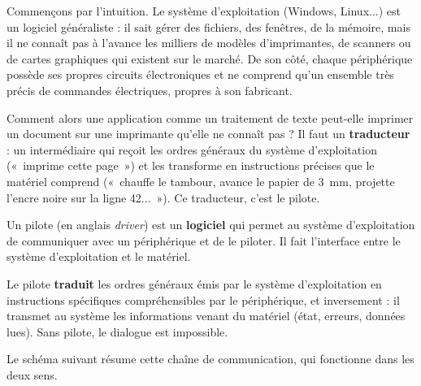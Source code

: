 \documentclass[11pt]{article}
\newcommand{\cle}[1]{{\popxbold\color{popdark}#1}}
\begin{document}
Commençons par l'intuition. Le système d'exploitation (Windows, Linux...) est un logiciel généraliste : il sait gérer des fichiers, des fenêtres, de la mémoire, mais il ne connaît pas à l'avance les milliers de modèles d'imprimantes, de scanners ou de cartes graphiques qui existent sur le marché. De son côté, chaque périphérique possède ses propres circuits électroniques et ne comprend qu'un ensemble très précis de commandes électriques, propres à son fabricant.

Comment alors une application comme un traitement de texte peut-elle imprimer un document sur une imprimante qu'elle ne connaît pas ? Il faut un \textbf{traducteur} : un intermédiaire qui reçoit les ordres généraux du système d'exploitation («~imprime cette page~») et les transforme en instructions précises que le matériel comprend («~chauffe le tambour, avance le papier de 3~mm, projette l'encre noire sur la ligne 42...~»). Ce traducteur, c'est le pilote.

\begin{definition}
Un \cle{pilote} (en anglais \emph{driver}) est un \textbf{logiciel} qui permet au système d'exploitation de communiquer avec un périphérique et de le piloter. Il fait l'interface entre le système d'exploitation et le matériel.
\end{definition}

\begin{aretenir}
Le pilote \textbf{traduit} les ordres généraux émis par le système d'exploitation en instructions spécifiques compréhensibles par le périphérique, et inversement : il transmet au système les informations venant du matériel (état, erreurs, données lues). Sans pilote, le dialogue est impossible.
\end{aretenir}

Le schéma suivant résume cette chaîne de communication, qui fonctionne dans les deux sens.
\end{document}
